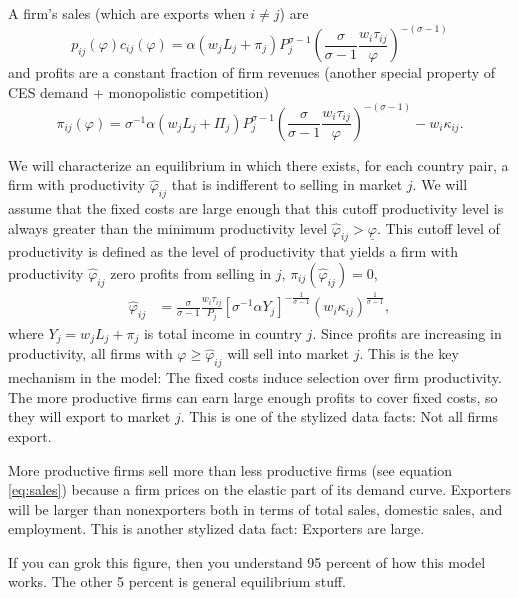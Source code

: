 \documentclass[11pt, pdftex]{article}
\begin{document}
A firm's sales (which are exports when $i \neq j$) are
\begin{equation}\label{eq:sales}
    p_{ij}(\varphi)c_{ij}(\varphi)= \alpha\left(w_jL_j+\pi_j \right)P_j^{\sigma-1}\left(\frac{\sigma}{\sigma-1}\frac{w_i\tau_{ij}}{ \varphi} \right)^{-(\sigma-1)}
\end{equation}
and profits are a constant fraction of firm revenues (another special property of CES demand + monopolistic competition)
\begin{equation}\label{eq:profit}
    \pi_{ij}(\varphi)= \sigma^{-1}\alpha\left(w_jL_j+\Pi_j \right)P_j^{\sigma-1}\left(\frac{\sigma}{\sigma-1} \frac{w_i\tau_{ij}}{ \varphi} \right)^{-(\sigma-1)}-w_i\kappa_{ij}.
\end{equation}

We will characterize an equilibrium in which there exists, for each country pair, a firm with productivity $\hat{\varphi}_{ij}$ that is indifferent to selling in market $j$.  We will assume that the fixed costs are large enough that this cutoff productivity level is always greater than the minimum productivity level $\hat{\varphi}_{ij}>\underline{\varphi}$.   This cutoff level of productivity is defined as the level of productivity that yields a firm with productivity $\hat{\varphi}_{ij}$  zero profits from selling in  $j$, $\pi_{ij}(\hat{\varphi}_{ij})=0$,
\begin{align}
  \hat{\varphi}_{ij} &= \frac{\sigma}{\sigma-1}\frac{w_i\tau_{ij}}{P_j} [\sigma^{-1}\alpha Y_j]^{-\frac{1}{\sigma-1}}(w_i\kappa_{ij})^{\frac{1}{\sigma-1}},
\end{align}
where $Y_j=w_jL_j+\pi_j$ is total income in country $j$. Since profits are increasing in productivity, all firms with $\varphi \geq \hat{\varphi}_{ij}$ will sell into market $j$.  This is the key mechanism in the model: The fixed costs induce selection over firm productivity.  The more productive firms can earn large enough profits to cover fixed costs, so they will export to market $j$. This is one of the stylized data facts: Not all firms export.

More productive firms sell more than less productive firms (see equation \ref{eq:sales}) because a firm prices on the elastic part of its demand curve. Exporters will be larger than nonexporters both in terms of total sales, domestic sales, and employment.  This is another stylized data fact: Exporters are large.

If you can grok this figure, then you understand 95 percent of how this model works. The other 5 percent is general equilibrium stuff.
\end{document}
